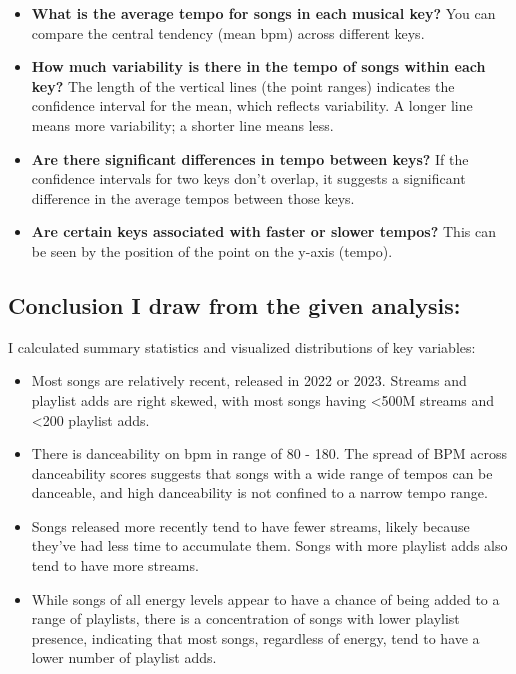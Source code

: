 \documentclass[
]{article}
\providecommand{\tightlist}{%
  \setlength{\itemsep}{0pt}\setlength{\parskip}{0pt}}
\begin{document}
\begin{itemize}
\tightlist
\item
  \textbf{What is the average tempo for songs in each musical key?} You
  can compare the central tendency (mean bpm) across different keys.
\item
  \textbf{How much variability is there in the tempo of songs within
  each key?} The length of the vertical lines (the point ranges)
  indicates the confidence interval for the mean, which reflects
  variability. A longer line means more variability; a shorter line
  means less.
\item
  \textbf{Are there significant differences in tempo between keys?} If
  the confidence intervals for two keys don't overlap, it suggests a
  significant difference in the average tempos between those keys.
\item
  \textbf{Are certain keys associated with faster or slower tempos?}
  This can be seen by the position of the point on the y-axis (tempo).
\end{itemize}

\hypertarget{conclusion-i-draw-from-the-given-analysis}{%
\subsection{Conclusion I draw from the given
analysis:}\label{conclusion-i-draw-from-the-given-analysis}}

I calculated summary statistics and visualized distributions of key
variables:

\begin{itemize}
\item
  Most songs are relatively recent, released in 2022 or 2023. Streams
  and playlist adds are right skewed, with most songs having
  \textless500M streams and \textless200 playlist adds.
\item
  There is danceability on bpm in range of 80 - 180. The spread of BPM
  across danceability scores suggests that songs with a wide range of
  tempos can be danceable, and high danceability is not confined to a
  narrow tempo range.
\item
  Songs released more recently tend to have fewer streams, likely
  because they've had less time to accumulate them. Songs with more
  playlist adds also tend to have more streams.
\item
  While songs of all energy levels appear to have a chance of being
  added to a range of playlists, there is a concentration of songs with
  lower playlist presence, indicating that most songs, regardless of
  energy, tend to have a lower number of playlist adds.
\end{itemize}
\end{document}
